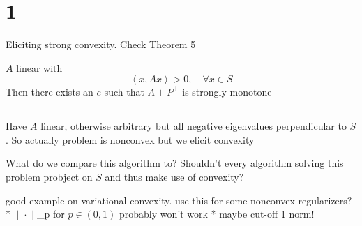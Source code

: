 \documentclass{scrartcl}
\begin{document}
\section{1}%
Eliciting strong convexity. 
Check Theorem 5

$A$ linear with
\begin{equation}
  \left\langle x, Ax \right\rangle > 0, \quad \forall x \in S
\end{equation}
Then there exists an $e$ such that $A+P^{\perp}$ is strongly monotone

\subsection{}%
Have $A$ linear, otherwise arbitrary but all negative eigenvalues perpendicular to $S$. So actually problem is nonconvex but we elicit convexity
\begin{remark}
  What do we compare this algorithm to? Shouldn't every  algorithm solving this problem probject on $S$ and thus make use of convexity?
\end{remark}

good example on variational convexity. use this for some nonconvex regularizers? 
* $\lVert \cdot \rVert$_{p} for $p \in (0,1)$ probably won't work
* maybe cut-off 1 norm!
\end{document}
